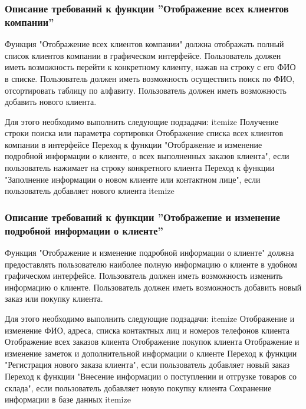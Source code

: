 \documentclass[russian, utf8, 12pt,pointsubsection,floatsubsection]{eskdtext}
\begin{document}


\subsubsection{Описание требований к функции ''Отображение всех клиентов компании''}
Функция "Отображение всех клиентов компании" должна отображать полный список клиентов компании в графическом интерфейсе. Пользователь должен иметь возможность перейти к конкретному клиенту, нажав на строку с его ФИО в списке. Пользователь должен иметь возможность осуществить поиск по ФИО, отсортировать таблицу по алфавиту. Пользователь должен иметь возможность добавить нового клиента.

Для этого необходимо выполнить следующие подзадачи:
itemize
Получение строки поиска или параметра сортировки
Отображение списка всех клиентов компании в интерфейсе
Переход к функции "Отображение и изменение подробной информации о клиенте, о всех выполненных заказов клиента", если пользователь нажимает на строку конкретного клиента
Переход к функции "Заполнение информации о новом клиенте или контактном лице", если пользователь добавляет нового клиента
itemize

\subsubsection{Описание требований к функции ''Отображение и изменение подробной информации о клиенте''}
Функция "Отображение и изменение подробной информации о клиенте" должна предоставлять пользователю наиболее полную информацию о клиенте в удобном графическом интерфейсе. Пользователь должен иметь возможность изменить информацию о клиенте. Пользователь должен иметь возможность добавить новый заказ или покупку клиента.

Для этого необходимо выполнить следующие подзадачи:
itemize
Отображение и изменение ФИО, адреса, списка контактных лиц и номеров телефонов клиента
Отображение всех заказов клиента
Отображение покупок клиента
Отображение и изменение заметок и дополнительной информации о клиенте
Переход к функции "Регистрация нового заказа клиента", если пользователь добавляет новый заказ
Переход к функции "Внесение информации о поступлении и отгрузке товаров со склада", если пользователь добавляет новую покупку клиента
Сохранение информации в базе данных
itemize
\end{document}

